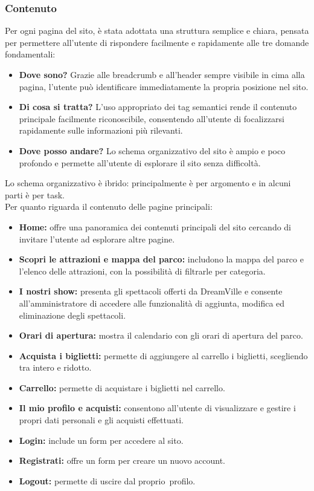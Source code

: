 \subsubsection{Contenuto}
Per ogni pagina del sito, è stata adottata una struttura semplice e chiara, pensata per permettere all'utente di rispondere facilmente e rapidamente alle tre domande fondamentali:
\begin{itemize}
    \item \textbf{Dove sono?} Grazie alle breadcrumb e all'header sempre visibile in cima alla pagina, l'utente può identificare immediatamente la propria posizione nel sito.
    \item \textbf{Di cosa si tratta?} L'uso appropriato dei tag semantici rende il contenuto principale facilmente riconoscibile, consentendo all'utente di focalizzarsi rapidamente sulle informazioni più rilevanti.
    \item \textbf{Dove posso andare?} Lo schema organizzativo del sito è ampio e poco profondo e permette all'utente di esplorare il sito senza difficoltà.
\end{itemize}
Lo schema organizzativo è ibrido: principalmente è per argomento e in alcuni parti è per task.\\
Per quanto riguarda il contenuto delle pagine principali:
\begin{itemize}
    \item \textbf{Home:} offre una panoramica dei contenuti principali del sito cercando di invitare l'utente ad esplorare altre pagine.
    \item \textbf{Scopri le attrazioni e mappa del parco:} includono la mappa del parco e l'elenco delle attrazioni, con la possibilità di filtrarle per categoria.
    \item \textbf{I nostri show:} presenta gli spettacoli offerti da DreamVille e consente all'amministratore di accedere alle funzionalità di aggiunta, modifica ed eliminazione degli spettacoli.
    \item \textbf{Orari di apertura:} mostra il calendario con gli orari di apertura del parco.
    \item \textbf{Acquista i biglietti:} permette di aggiungere al carrello i biglietti, scegliendo tra intero e ridotto.
    \item \textbf{Carrello:} permette di acquistare i biglietti nel carrello.
    \item \textbf{Il mio profilo e acquisti:} consentono all'utente di visualizzare e gestire i propri dati personali e gli acquisti effettuati.
    \item \textbf{Login:} include un form per accedere al sito.
    \item \textbf{Registrati:} offre un form per creare un nuovo account.
    \item \textbf{Logout:} permette di uscire dal proprio profilo.
\end{itemize}
